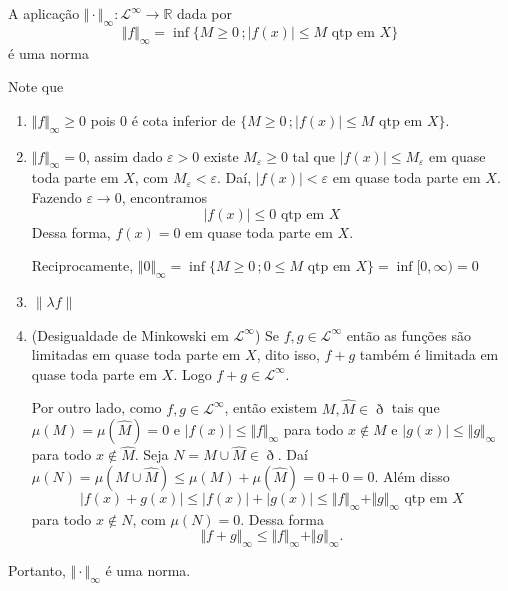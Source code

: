 \documentclass[a4paper, 11pt]{book}
\theoremstyle{definition}
\newcommand{\bR}{\mathbb{R}}
\newcommand{\cL}{\mathcal{L}}
\begin{document}
\begin{pbox}
    A aplicação $\Vert \cdot \Vert_\infty : \cL^\infty \to \bR$ dada por
    \[
        \Vert f \Vert_\infty = \inf \{M \geqslant 0 \,; |f(x)|\leqslant M \text{ qtp em } X\}
    \]
    é uma norma
\end{pbox}
\begin{prf}
    Note que
    \begin{enumerate}
        \item $\Vert f \Vert_\infty \geqslant 0$ pois $0$ é cota inferior de $\{M \geqslant 0 \,; |f(x)|\leqslant M \text{ qtp em } X\}$.
        \item $\Vert f \Vert_\infty = 0$, assim dado $\varepsilon > 0$ existe $M_\varepsilon \geqslant 0$ tal que $|f(x)| \leqslant M_\varepsilon$ em quase toda parte em $X$, com $M_\varepsilon < \varepsilon$.
        Daí, $|f(x)| < \varepsilon$ em quase toda parte em $X$.
        Fazendo $\varepsilon \to 0$, encontramos
        \[
            |f(x)| \leqslant 0 \text{ qtp em } X
        \]
        Dessa forma, $f(x) = 0$ em quase toda parte em $X$.

        Reciprocamente, $\Vert 0 \Vert_\infty = \inf \{M \geqslant 0 \,; 0 \leqslant M \text{ qtp em } X\} = \inf[0,\infty) = 0$

        \item $\| \lambda f \|$

        \item (Desigualdade de Minkowski em $\cL^\infty$) Se $f, g \in \cL^\infty$ então as funções são limitadas em quase toda parte em $X$, dito isso, $f + g$ também é limitada em quase toda parte em $X$.
        Logo $f + g \in \cL^\infty$.

        Por outro lado, como $f, g \in \cL^\infty$, então existem $M,\hat M \in \eth$ tais que $\mu(M) = \mu(\hat M) = 0$ e $|f(x)| \leqslant \Vert f \Vert_\infty$ para todo $x \not\in M$ e $|g(x)| \leqslant \Vert g \Vert_\infty$ para todo $x \not\in \hat M$.
        Seja $N = M \cup \hat M \in \eth$.
        Daí $\mu(N) = \mu(M \cup \hat M) \leqslant \mu(M) + \mu(\hat M) = 0 + 0 = 0$.
        Além disso
        \[
            |f(x) + g(x)| \leqslant |f(x)| + |g(x)| \leqslant \Vert f \Vert_\infty + \Vert g \Vert_\infty \text{ qtp em } X
        \]
        para todo $x \not\in N$, com $\mu(N) = 0$.
        Dessa forma
        \[
            \Vert f + g \Vert_\infty \leqslant \Vert f \Vert_\infty + \Vert g \Vert_\infty.
        \]
    \end{enumerate}
    Portanto, $\Vert \cdot \Vert_\infty$ é uma norma.
\end{prf}
\end{document}
